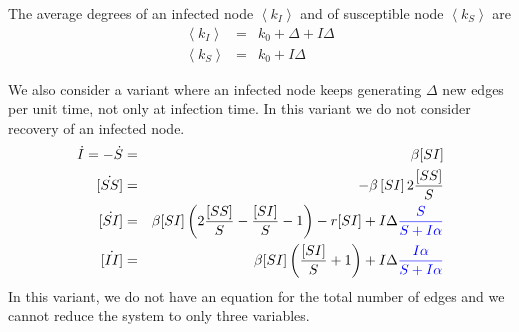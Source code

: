 \documentclass[11pt,final]{article}
\newcommand{\blue}[1]{{\color{blue}{#1}\normalcolor}}
\newcommand{\bea}{\begin{eqnarray}}
\newcommand{\eea}{\end{eqnarray}}
\newcommand{\f}[2]{\dfrac{#1}{#2}}
\newcommand{\avg}[1]{\left\langle #1 \right\rangle} %
\newcommand{\al}{\alpha}
\newcommand{\dl}{\Delta}
\newcommand{\rup}[1]{\left(#1\right)}
\begin{document}
The average degrees of an infected node $\avg{k_{I}}$ and of susceptible node $\avg{k_{S}}$ are
\bea
\avg{k_{I}}&=& k_{0}+\dl +I\dl\\
\avg{k_{S}}&=& k_{0}+I \dl
\eea

We also consider a variant where an infected node keeps generating $\dl$ new edges per unit time,
not only at infection time. In this variant we do not consider recovery of an infected node.
\bea
\dot{I}=-\dot{S}&=& \beta [SI] \\
\dot{[SS]}&=& -\beta \,[SI]\, 2\f{[SS]}{S} \\
\dot{[SI]}&=& \beta[SI] \rup{ 2\f{[SS]}{S} -\f{[SI]}{S}-1} -r[SI] + I \dl \blue{\f{S}{S+I\al} } \\
\dot{[II]}&=& \beta[SI] \rup{\f{[SI]}{S} +1} +I \dl  \blue{\f{I\al}{S+I\al}}
\eea
In this variant, we do not have an equation for the total number of edges and we cannot reduce the system to only three variables.

{}

\end{document}
